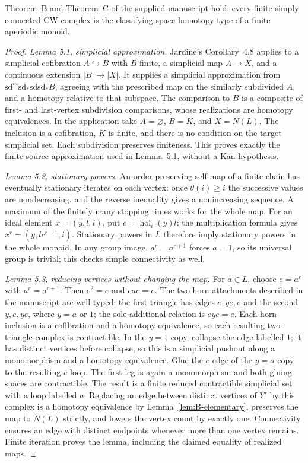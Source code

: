 \begin{proposition}
\label{prop:B-finite-realization}
Theorem~B and Theorem~C of the supplied manuscript hold: every finite
simply connected CW complex is the classifying-space homotopy type of a
finite aperiodic monoid.
\end{proposition}
\begin{proof}
\emph{Lemma 5.1, simplicial approximation.}  Jardine's Corollary~4.8
\cite{Jardine2004B}
applies to a simplicial cofibration $A\hookrightarrow B$ with $B$
finite, a simplicial map $A\to X$, and a continuous extension
$|B|\to|X|$.  It supplies a simplicial approximation from
$\mathrm{sd}^m\mathrm{sd}_*\mathrm{sd}\mathrm{sd}_* B$, agreeing
with the prescribed map on the similarly subdivided $A$, and a
homotopy relative to that subspace.  The comparison to $B$ is a
composite of first- and last-vertex subdivision comparisons, whose
realizations are homotopy equivalences.  In the application take
$A=\varnothing$, $B=K$, and $X=N(L)$.  The inclusion is a cofibration,
$K$ is finite, and there is no condition on the target simplicial set.
Each subdivision preserves finiteness.  This proves exactly the
finite-source approximation used in Lemma~5.1, without a Kan hypothesis.

\emph{Lemma 5.2, stationary powers.}  An order-preserving self-map of a
finite chain has eventually stationary iterates on each vertex: once
$\theta(i)\ge i$ the successive values are nondecreasing, and the
reverse inequality gives a nonincreasing sequence.  A maximum of the
finitely many stopping times works for the whole map.  For an ideal
element $x=(y,l,i)$, put $c=\operatorname{hol}_i(y)l$; the
multiplication formula gives $x^r=(y,lc^{r-1},i)$.  Stationary powers
in $L$ therefore imply stationary powers in the whole monoid.
In any group image, $a^r=a^{r+1}$ forces $a=1$, so its universal group
is trivial; this checks simple connectivity as well.

\emph{Lemma 5.3, reducing vertices without changing the map.}  For
$a\in L$, choose $e=a^r$ with $a^r=a^{r+1}$.  Then $e^2=e$ and
$eae=e$.  The two horn attachments described in the manuscript are
well typed: the first triangle has edges $e,ye,e$ and the second
$y,e,ye$, where $y=a$ or $1$; the sole additional relation is
$eye=e$.  Each horn inclusion is a cofibration and a homotopy
equivalence, so each resulting two-triangle complex is contractible.
In the $y=1$ copy, collapse the edge labelled $1$; it has distinct
vertices before collapse, so this is a simplicial pushout along a
monomorphism and a homotopy equivalence.  Glue the $e$ edge of the
$y=a$ copy to the resulting $e$ loop.  The first leg is again a
monomorphism and both gluing spaces are contractible.  The result is a
finite reduced contractible simplicial set with a loop labelled $a$.
Replacing an edge between distinct vertices of $Y'$ by this complex
is a homotopy equivalence by Lemma~\ref{lem:B-elementary}, preserves
the map to $N(L)$ strictly, and lowers the vertex count by exactly one.
Connectivity ensures an edge with distinct endpoints whenever more
than one vertex remains.  Finite iteration proves the lemma, including
the claimed equality of realized maps.


\end{proof}
